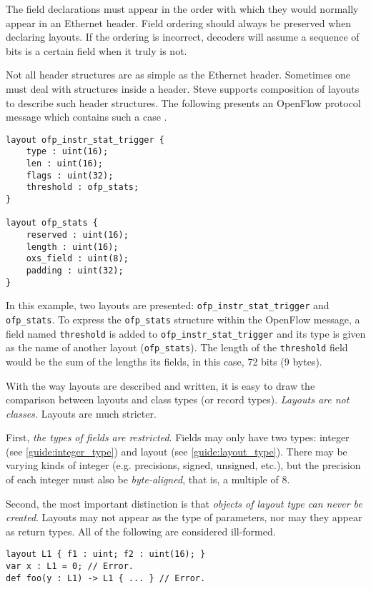 The field declarations must appear in the order with which they would normally appear
in an Ethernet header. Field ordering should always be
preserved when declaring layouts. If the ordering is incorrect, decoders will
assume a sequence of bits is a certain field when it truly is not. 

Not all header structures are as simple as the Ethernet header. Sometimes one
must deal with structures inside a header. Steve supports composition of layouts to describe such header structures.
The following presents an OpenFlow protocol message which contains such a case \cite{openflow_spec}.

\begin{lstlisting}
layout ofp_instr_stat_trigger {
	type : uint(16); 
	len : uint(16); 
	flags : uint(32); 
	threshold : ofp_stats;
}

layout ofp_stats {
	reserved : uint(16); 
	length : uint(16); 
	oxs_field : uint(8);
	padding : uint(32);
}
\end{lstlisting}

In this example, two layouts are presented: \texttt{ofp\_instr\_stat\_trigger} and \texttt{ofp\_stats}. 
To express the \texttt{ofp\_stats} structure within the OpenFlow message, a field named \texttt{threshold} is added to
\texttt{ofp\_instr\_stat\_trigger} and its type is given as the name of another layout (\texttt{ofp\_stats}). The length of the \texttt{threshold} field would be the sum of the lengths
its fields, in this case, 72 bits (9 bytes).

With the way
layouts are described and written, it is easy to draw the comparison between 
layouts and
class types (or record types). \textit{Layouts are not 
classes.} Layouts are much stricter.

First, \textit{the types of fields are restricted}. Fields may only
have two types: integer (see \ref{guide:integer_type}) and layout
(see \ref{guide:layout_type}). There may be varying kinds of integer (e.g.
precisions, signed, unsigned, etc.), but the precision of each integer must also
be \textit{byte-aligned}, that is, a multiple of 8.

Second, the most important distinction is that \textit{objects of layout type
can never be created}. Layouts may not appear as the type of parameters, nor may
they appear as return types. All of the following are considered ill-formed.

\begin{lstlisting}
layout L1 { f1 : uint; f2 : uint(16); }
var x : L1 = 0; // Error.
def foo(y : L1) -> L1 { ... } // Error.
\end{lstlisting}

